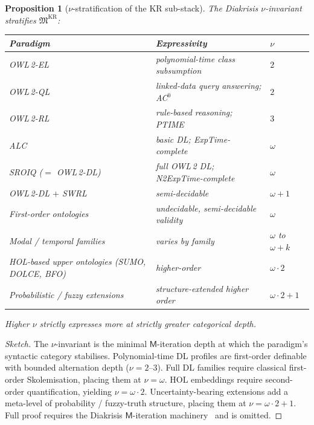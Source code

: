\documentclass[11pt, a4paper]{article}
\newtheorem{proposition}[theorem]{Proposition}
\theoremstyle{definition}
\theoremstyle{remark}
\newcommand{\fM}{\mathfrak{M}}
\newcommand{\OWL}{\textsc{OWL\,2}}
\newcommand{\SUMO}{\textsc{SUMO}}
\newcommand{\DOLCE}{\textsc{DOLCE}}
\newcommand{\BFO}{\textsc{BFO}}
\newcommand{\SWRL}{\textsc{SWRL}}
\begin{document}
\begin{proposition}[$\nu$-stratification of the KR sub-stack]
\label{prop:kr-nu-stratification}
The Diakrisis $\nu$-invariant stratifies $\fM^{\mathrm{KR}}$:
\begin{center}
\small
\begin{tabular}{@{}lll@{}}
\toprule
Paradigm & Expressivity & $\nu$ \\ \midrule
\OWL-\textsc{EL} & polynomial-time class subsumption & $2$ \\
\OWL-\textsc{QL} & linked-data query answering; AC$^0$ & $2$ \\
\OWL-\textsc{RL} & rule-based reasoning; PTIME & $3$ \\
\textsf{ALC} & basic DL; ExpTime-complete & $\omega$ \\
\textsf{SROIQ} ($=$ \OWL-\textsc{DL}) & full OWL\,2 DL; N2ExpTime-complete & $\omega$ \\
\OWL-\textsc{DL} $+$ \SWRL & semi-decidable & $\omega + 1$ \\
First-order ontologies & undecidable, semi-decidable validity & $\omega$ \\
Modal / temporal families & varies by family & $\omega$ to $\omega + k$ \\
HOL-based upper ontologies (\SUMO, \DOLCE, \BFO) & higher-order & $\omega \cdot 2$ \\
Probabilistic / fuzzy extensions & structure-extended higher order & $\omega \cdot 2 + 1$ \\
\bottomrule
\end{tabular}
\end{center}
Higher $\nu$ strictly expresses more at strictly greater categorical depth.
\end{proposition}

\begin{proof}[Sketch]
The $\nu$-invariant is the minimal $\mathsf{M}$-iteration depth at which the paradigm's syntactic category stabilises. Polynomial-time DL profiles are first-order definable with bounded alternation depth ($\nu = 2$--$3$). Full DL families require classical first-order Skolemisation, placing them at $\nu = \omega$. HOL embeddings require second-order quantification, yielding $\nu = \omega \cdot 2$. Uncertainty-bearing extensions add a meta-level of probability / fuzzy-truth structure, placing them at $\nu = \omega \cdot 2 + 1$. Full proof requires the Diakrisis $\mathsf{M}$-iteration machinery~\cite{Diakrisis} and is omitted.
\end{proof}
\end{document}
